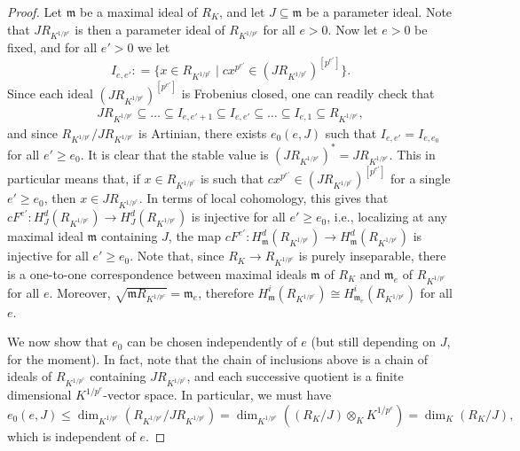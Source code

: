 \documentclass[reqno,11pt]{amsart}
\makeatletter
\numberwithin{equation}{section}
\theoremstyle{definition}
\theoremstyle{definition}
\theoremstyle{definition}
\theoremstyle{remark}
\newcommand{\fm}{\mathfrak{m}}
\renewcommand*{\eqref}[1]{
  \hyperref[{#1}]{\textup{\tagform@{\ref*{#1}}}}
}
\makeatother
\begin{document}
\begin{proof}
Let $\fm$ be a maximal ideal of $R_K$, and let $J \subseteq \fm$ be a parameter ideal. Note that $JR_{K^{1/p^e}}$ is then a parameter ideal of $R_{K^{1/p^e}}$ for all $e >0$. Now let $e >0$ be fixed, and for all $e'>0$ we let $$I_{e,e'}: = \{x \in R_{K^{1/p^e}} \mid cx^{p^{e'}} \in (JR_{K^{1/p^e}})^{[p^{e'}]}\}.$$ Since each ideal $(J R_{K^{1/p^e}})^{[p^{e'}]}$ is Frobenius closed, one can readily check that
\begin{align}
J R_{K^{1/p^e}} \subseteq \ldots \subseteq I_{e,e'+1} \subseteq I_{e,e'} \subseteq \ldots \subseteq I_{e,1} \subseteq R_{K^{1/p^e}},\label{lem:key lemma 1}
\end{align}
and since $R_{K^{1/p^e}}/JR_{K^{1/p^e}}$ is Artinian, there exists $e_0(e,J)$ such that $I_{e,e'} = I_{e,e_0}$ for all $e' \geq e_0$. It is clear that the stable value is $(JR_{K^{1/p^e}})^* = JR_{K^{1/p^e}}$. This in particular means that, if $x \in R_{K^{1/p^e}}$ is such that $cx^{p^{e'}} \in (JR_{K^{1/p^e}})^{[p^{e'}]}$ for a single $e' \geq e_0$, then $x \in JR_{K^{1/p^e}}$. In terms of local cohomology, this gives that $cF^{e'}\colon  H^{d}_J(R_{K^{1/p^e}}) \to H^{d}_J(R_{K^{1/p^e}})$ is injective for all $e' \geq e_0$, i.e., localizing at any maximal ideal $\fm$ containing $J$, the map $cF^{e'}\colon H^d_\fm(R_{K^{1/p^e}}) \to H^d_\fm(R_{K^{1/p^e}})$ is injective for all $e' \geq e_0$. Note that, since $R_K \to R_{K^{1/p^e}}$ is purely inseparable, there is a one-to-one correspondence between maximal ideals $\fm$ of $R_K$ and $\fm_e$ of $R_{K^{1/p^e}}$ for all $e$. Moreover, $\sqrt{\fm R_{K^{1/p^e}}} = \fm_e$, therefore $H^i_{\fm}(R_{K^{1/p^e}}) \cong H^i_{\fm_e}(R_{K^{1/p^e}})$ for all $e$.

We now show that $e_0$ can be chosen independently of $e$ (but still depending on $J$, for the moment). In fact, note that the chain of inclusions \eqref{lem:key lemma 1} above is a chain of ideals of $R_{K^{1/p^e}}$ containing $JR_{K^{1/p^e}}$, and each successive quotient is a finite dimensional $K^{1/p^e}$-vector space. In particular, we must have 
\[
e_0(e,J) \leq \dim_{K^{1/p^e}}(R_{K^{1/p^e}}/JR_{K^{1/p^e}}) = \dim_{K^{1/p^e}} ((R_K/J) \otimes_K K^{1/p^e}) =  \dim_K(R_K/J),
\]
which is independent of $e$. 


\end{proof}
\end{document}
